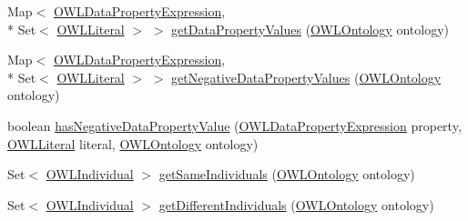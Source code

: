 \begin{DoxyCompactItemize}
\item 
Map$<$ \hyperlink{interfaceorg_1_1semanticweb_1_1owlapi_1_1model_1_1_o_w_l_data_property_expression}{O\-W\-L\-Data\-Property\-Expression}, \\*
Set$<$ \hyperlink{interfaceorg_1_1semanticweb_1_1owlapi_1_1model_1_1_o_w_l_literal}{O\-W\-L\-Literal} $>$ $>$ \hyperlink{classuk_1_1ac_1_1manchester_1_1cs_1_1owl_1_1owlapi_1_1_o_w_l_individual_impl_a70df735195443fd67b9d642dba39e114}{get\-Data\-Property\-Values} (\hyperlink{interfaceorg_1_1semanticweb_1_1owlapi_1_1model_1_1_o_w_l_ontology}{O\-W\-L\-Ontology} ontology)
\item 
Map$<$ \hyperlink{interfaceorg_1_1semanticweb_1_1owlapi_1_1model_1_1_o_w_l_data_property_expression}{O\-W\-L\-Data\-Property\-Expression}, \\*
Set$<$ \hyperlink{interfaceorg_1_1semanticweb_1_1owlapi_1_1model_1_1_o_w_l_literal}{O\-W\-L\-Literal} $>$ $>$ \hyperlink{classuk_1_1ac_1_1manchester_1_1cs_1_1owl_1_1owlapi_1_1_o_w_l_individual_impl_a4d1d7fb667ebb97871aee001229f1d71}{get\-Negative\-Data\-Property\-Values} (\hyperlink{interfaceorg_1_1semanticweb_1_1owlapi_1_1model_1_1_o_w_l_ontology}{O\-W\-L\-Ontology} ontology)
\item 
boolean \hyperlink{classuk_1_1ac_1_1manchester_1_1cs_1_1owl_1_1owlapi_1_1_o_w_l_individual_impl_aa9348db30b695a4639acb955e833d4f3}{has\-Negative\-Data\-Property\-Value} (\hyperlink{interfaceorg_1_1semanticweb_1_1owlapi_1_1model_1_1_o_w_l_data_property_expression}{O\-W\-L\-Data\-Property\-Expression} property, \hyperlink{interfaceorg_1_1semanticweb_1_1owlapi_1_1model_1_1_o_w_l_literal}{O\-W\-L\-Literal} literal, \hyperlink{interfaceorg_1_1semanticweb_1_1owlapi_1_1model_1_1_o_w_l_ontology}{O\-W\-L\-Ontology} ontology)
\item 
Set$<$ \hyperlink{interfaceorg_1_1semanticweb_1_1owlapi_1_1model_1_1_o_w_l_individual}{O\-W\-L\-Individual} $>$ \hyperlink{classuk_1_1ac_1_1manchester_1_1cs_1_1owl_1_1owlapi_1_1_o_w_l_individual_impl_ac81256ad74305042ac9d6056410096b9}{get\-Same\-Individuals} (\hyperlink{interfaceorg_1_1semanticweb_1_1owlapi_1_1model_1_1_o_w_l_ontology}{O\-W\-L\-Ontology} ontology)
\item 
Set$<$ \hyperlink{interfaceorg_1_1semanticweb_1_1owlapi_1_1model_1_1_o_w_l_individual}{O\-W\-L\-Individual} $>$ \hyperlink{classuk_1_1ac_1_1manchester_1_1cs_1_1owl_1_1owlapi_1_1_o_w_l_individual_impl_a32d73db7829b02d5b87e60026e6e43d7}{get\-Different\-Individuals} (\hyperlink{interfaceorg_1_1semanticweb_1_1owlapi_1_1model_1_1_o_w_l_ontology}{O\-W\-L\-Ontology} ontology)

\end{DoxyCompactItemize}
